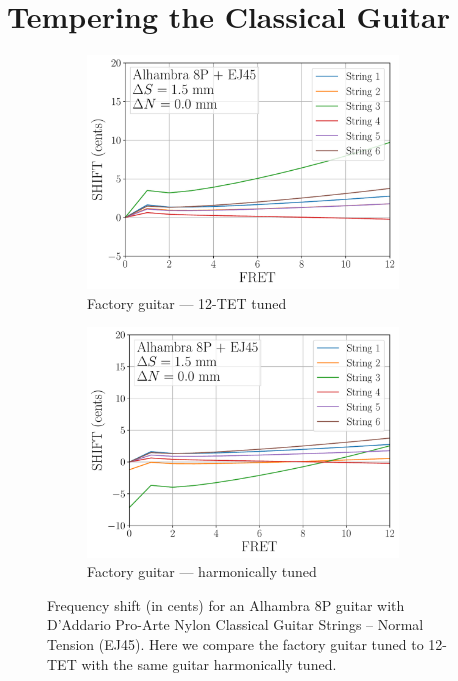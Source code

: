 %
%
%

 \section{Tempering the Classical Guitar\label{app:temp}}

 \begin{figure}
  \centering
  \begin{subfigure}[b]{0.45\textwidth}
   \centering
   \includegraphics[width=3.25in]{figures/shift_alhambra8p_ej45_factory}
   \caption{Factory guitar --- 12-TET tuned}
   \label{fig:shift_alhambra8p_ej45_fact_temp}
  \end{subfigure}
  \hspace{0.25in}
  \begin{subfigure}[b]{0.45\textwidth}
   \centering
   \includegraphics[width=3.25in]{figures/shift_alhambra8p_ej45_harmonic}
   \caption{Factory guitar --- harmonically tuned}
   \label{fig:shift_alhambra8p_ej45_harmonic}
  \end{subfigure}
  \caption{\label{fig:compensation_alhambra8p_ej45_temp} Frequency shift (in cents) for an Alhambra 8P guitar with D'Addario Pro-Arte Nylon Classical Guitar Strings -- Normal Tension (EJ45). Here we compare the factory guitar tuned to 12-TET with the same guitar harmonically tuned.}
 \end{figure}
